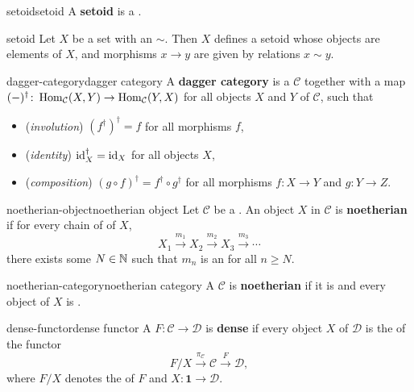 \begin{topic}{setoid}{setoid}
    A \textbf{setoid} is a  .
\end{topic}

\begin{example}{setoid}
    Let $X$ be a set with an  $\sim$. Then $X$ defines a setoid whose objects are elements of $X$, and morphisms $x \to y$ are given by relations $x \sim y$.
\end{example}

\begin{topic}{dagger-category}{dagger category}
    A \textbf{dagger category} is a  $\mathcal{C}$ together with a map $(-)^\dagger \colon \operatorname{Hom}_\mathcal{C}(X, Y) \to \operatorname{Hom}_\mathcal{C}(Y, X)$ for all objects $X$ and $Y$ of $\mathcal{C}$, such that
    \begin{itemize}
        \item (\textit{involution}) $(f^\dagger)^\dagger = f$ for all morphisms $f$,
        \item (\textit{identity}) $\textup{id}_X^\dagger = \textup{id}_X$ for all objects $X$,
        \item (\textit{composition}) $(g \circ f)^\dagger = f^\dagger \circ g^\dagger$ for all morphisms $f \colon X \to Y$ and $g \colon Y \to Z$.
    \end{itemize}
\end{topic}

\begin{topic}{noetherian-object}{noetherian object}
    Let $\mathcal{C}$ be a . An object $X$ in $\mathcal{C}$ is \textbf{noetherian} if for every chain of  of $X$,
    \[ X_1 \xrightarrow{m_1} X_2 \xrightarrow{m_2} X_3 \xrightarrow{m_3} \cdots \]
    there exists some $N \in \mathbb{N}$ such that $m_n$ is an  for all $n \ge N$.
\end{topic}

\begin{topic}{noetherian-category}{noetherian category}
    A  $\mathcal{C}$ is \textbf{noetherian} if it is  and every object of $X$ is .
\end{topic}

\begin{topic}{dense-functor}{dense functor}
    A  $F \colon \mathcal{C} \to \mathcal{D}$ is \textbf{dense} if every object $X$ of $\mathcal{D}$ is the  of the functor
    \[ F/X \xrightarrow{\pi_\mathcal{C}} \mathcal{C} \xrightarrow{F} \mathcal{D} , \]
    where $F/X$ denotes the  of $F$ and $X \colon \textbf{1} \to \mathcal{D}$.
\end{topic}

